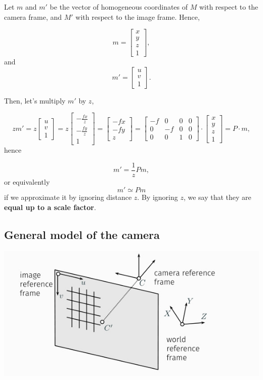 \documentclass[10pt]{report}
\begin{document}
Let \(m\) and \(m'\) be the vector of homogeneous coordinates of \(M\)
with respect to the camera frame, and \(M'\) with respect to the image
frame. Hence,

\[m = \begin{bmatrix} x \\ y \\ z \\ 1\end{bmatrix},\] and
\[m' = \begin{bmatrix} u \\ v \\ 1\end{bmatrix}.\]

Then, let's multiply \(m'\) by \(z\),

\[zm' = z\begin{bmatrix} u \\ v \\ 1\end{bmatrix} = z\begin{bmatrix} -\frac{fx}{z} \\ -\frac{fy}{z} \\ 1\end{bmatrix} = \begin{bmatrix} -fx \\ -fy \\ z\end{bmatrix} = \begin{bmatrix} -f & 0 & 0 & 0 \\ 0 & -f & 0 & 0 \\ 0 & 0 & 1 & 0 \end{bmatrix}\cdot \begin{bmatrix} x \\ y \\ z \\ 1 \end{bmatrix} = P \cdot m,\]
hence

\[m' = \frac{1}{z}Pm, \] or equivalently \[m' \simeq Pm\] if we
approximate it by ignoring distance \(z\). By ignoring \(z\), we say
that they are \textbf{equal up to a scale factor}.

\subsection{General model of the camera}
\label{sec:org04a0307}
\begin{center}
\includegraphics[scale=0.45]{./pics/cal/general-model.jpg}
\end{center}
\end{document}
